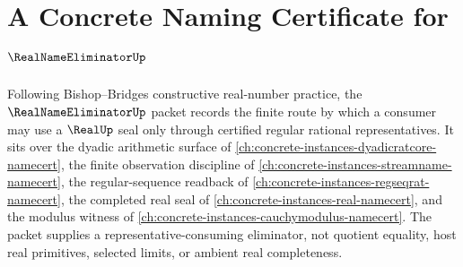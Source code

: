 \chapter{A Concrete Naming Certificate for $\RealNameEliminatorUp$}
\label{ch:concrete-instances-real-name-eliminator-namecert}

Following Bishop--Bridges constructive real-number practice, the $\RealNameEliminatorUp$ packet records the finite route by which a consumer may use a $\RealUp$ seal only through certified regular rational representatives. It sits over the dyadic arithmetic surface of \autoref{ch:concrete-instances-dyadicratcore-namecert}, the finite observation discipline of \autoref{ch:concrete-instances-streamname-namecert}, the regular-sequence readback of \autoref{ch:concrete-instances-regseqrat-namecert}, the completed real seal of \autoref{ch:concrete-instances-real-namecert}, and the modulus witness of \autoref{ch:concrete-instances-cauchymodulus-namecert}. The packet supplies a representative-consuming eliminator, not quotient equality, host real primitives, selected limits, or ambient real completeness.



